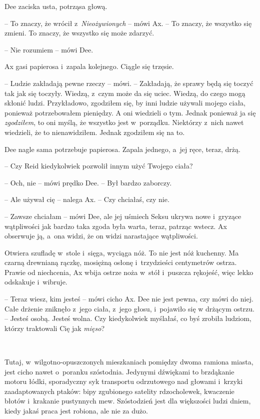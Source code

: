 \documentclass[oneside,polish,11pt,sfheadings]{mwbk}
\begin{document}
Dee zaciska usta, potrząsa głową.

-- To znaczy, że wrócił z~\emph{Nieożywionych} -- mówi Ax. -- To znaczy, że
wszystko się zmieni. To znaczy, że wszystko się może zdarzyć.

-- Nie rozumiem -- mówi Dee.

Ax gasi papierosa i~zapala kolejnego. Ciągle się trzęsie.

-- Ludzie zakładają pewne rzeczy -- mówi. -- Zakładają, że sprawy będą się
toczyć tak jak się toczyły. Wiedzą, z~czym może da się uciec. Wiedzą, do
czego mogą skłonić ludzi. Przykładowo, zgodziłem się, by inni ludzie
używali mojego ciała, ponieważ potrzebowałem pieniędzy. A oni wiedzieli
o tym. Jednak ponieważ ja się \emph{zgodziłem}, to oni myślą, że
wszystko jest w~porządku. Niektórzy z~nich nawet wiedzieli, że to
nienawidziłem. Jednak zgodziłem się na to.

Dee nagle sama potrzebuje papierosa. Zapala jednego, a~jej ręce, teraz,
drżą.

-- Czy Reid kiedykolwiek pozwolił innym użyć Twojego ciała?

-- Och, nie -- mówi prędko Dee. -- Był bardzo zaborczy.

-- Ale używał cię -- nalega Ax. -- Czy chciałaś, czy nie.

-- Zawsze chciałam -- mówi Dee, ale jej uśmiech Seksu ukrywa nowe i~gryzące wątpliwości jak bardzo taka zgoda była warta, teraz, patrząc
wstecz. Ax obserwuje ją, a~ona widzi, że on widzi narastające
wątpliwości.

Otwiera szufladę w~stole i~sięga, wyciąga nóż. To nie jest nóż kuchenny.
Ma czarną drewnianą rączkę, mosiężną osłonę i~trzydzieści centymetrów
ostrza. Prawie od niechcenia, Ax wbija ostrze noża w~stół i~puszcza
rękojeść, więc lekko odskakuje i~wibruje.

-- Teraz wiesz, kim jesteś -- mówi cicho Ax. Dee nie jest pewna, czy mówi
do niej. Całe drżenie zniknęło z~jego ciała, z~jego głosu, i~pojawiło się
w drżącym ostrzu. -- Jesteś osobą. Jesteś wolna. Czy kiedykolwiek
myślałaś, co byś zrobiła ludziom, którzy traktowali Cię jak
\emph{mięso}?

~

Tutaj, w~wilgotno-opuszczonych mieszkaniach pomiędzy dwoma ramiona
miasta, jest cicho nawet o~poranku szóstodnia. Jedynymi dźwiękami to
brzdąkanie motoru łódki, sporadyczny syk transportu odrzutowego nad
głowami i~krzyki zaadaptowanych ptaków: bipy zgubionego satelity
rdzocholewek, kwaczenie błotów i~krakanie pustynnych mew. Szóstodzień
jest dla większości ludzi dniem, kiedy jakaś praca jest robiona, ale nie
za dużo.
\end{document}
